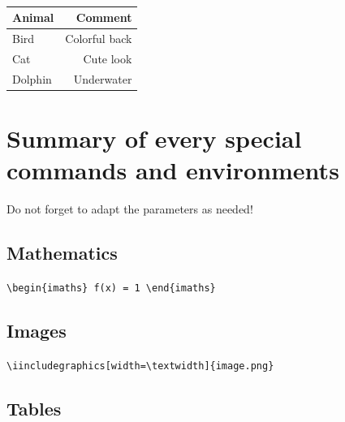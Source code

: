 \documentclass[11pt, a4paper]{article}
\begin{document}
\begin{example}
\begin{gridlayout}{\textwidth}{11cm}
\begin{row}{0.3}
\begin{cell}{0.3}
            \end{cell}
            \begin{cell}{0.05}
                ~
            \end{cell}
            \begin{cell}{0.3}
                \centering
                \vspace{1em}
                \begin{tabular}{lr}
                    \toprule
                    Animal & Comment \\
                    \midrule
                    Bird & Colorful back \\
                    Cat & Cute look \\
                    Dolphin & Underwater \\
                    \bottomrule
                \end{tabular}
            \end{cell}
        \end{row}
    \end{gridlayout}
\end{example}





\newpage
\section{Summary of every special commands and environments}
Do not forget to adapt the parameters as needed!

\subsection*{Mathematics}

\hfill
\lstinline[style=custom-latex]|\begin{imaths} f(x) = 1 \end{imaths}|



\subsection*{Images}

\hfill
\lstinline[style=custom-latex]|\iincludegraphics[width=\textwidth]{image.png}|



\subsection*{Tables}
\end{document}
